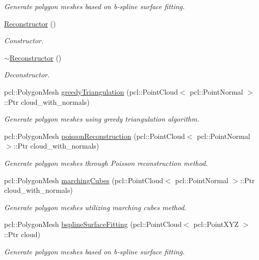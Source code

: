 \begin{DoxyCompactItemize}
\begin{DoxyCompactList}\small\item\em Generate polygon meshes based on b-\/spline surface fitting. \end{DoxyCompactList}\item 
\hyperlink{classhull__abstraction_1_1_reconstructor_a621404f6ce3a4515adf85491543ace34}{Reconstructor} ()
\begin{DoxyCompactList}\small\item\em Constructor. \end{DoxyCompactList}\item 
\hyperlink{classhull__abstraction_1_1_reconstructor_a0db70f08234b090c7a5c58872dbd16c4}{$\sim$\+Reconstructor} ()
\begin{DoxyCompactList}\small\item\em Deconstructor. \end{DoxyCompactList}\item 
pcl\+::\+Polygon\+Mesh \hyperlink{classhull__abstraction_1_1_reconstructor_a585b9418c1a64ec21c195c72139ce581}{greedy\+Triangulation} (pcl\+::\+Point\+Cloud$<$ pcl\+::\+Point\+Normal $>$\+::Ptr cloud\+\_\+with\+\_\+normals)
\begin{DoxyCompactList}\small\item\em Generate polygon meshes using greedy triangulation algorithm. \end{DoxyCompactList}\item 
pcl\+::\+Polygon\+Mesh \hyperlink{classhull__abstraction_1_1_reconstructor_a9b7e8bda9c001e4d2eab2712e2b57f04}{poisson\+Reconstruction} (pcl\+::\+Point\+Cloud$<$ pcl\+::\+Point\+Normal $>$\+::Ptr cloud\+\_\+with\+\_\+normals)
\begin{DoxyCompactList}\small\item\em Generate polygon meshes through Poisson reconstruction method. \end{DoxyCompactList}\item 
pcl\+::\+Polygon\+Mesh \hyperlink{classhull__abstraction_1_1_reconstructor_a41a0fa653923a21b3329b747f0c6943b}{marching\+Cubes} (pcl\+::\+Point\+Cloud$<$ pcl\+::\+Point\+Normal $>$\+::Ptr cloud\+\_\+with\+\_\+normals)
\begin{DoxyCompactList}\small\item\em Generate polygon meshes utilizing marching cubes method. \end{DoxyCompactList}\item 
pcl\+::\+Polygon\+Mesh \hyperlink{classhull__abstraction_1_1_reconstructor_a531c5dc53b28b4f1e48a318db1acea90}{bspline\+Surface\+Fitting} (pcl\+::\+Point\+Cloud$<$ pcl\+::\+Point\+X\+YZ $>$\+::Ptr cloud)
\begin{DoxyCompactList}\small\item\em Generate polygon meshes based on b-\/spline surface fitting. \end{DoxyCompactList}\end{DoxyCompactItemize}
